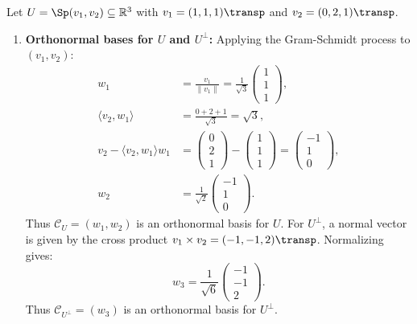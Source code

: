 \begin{exercisesolution*}
\label{sol:orthogonal_projection_computation}
Let $U = \Sp(v_1, v_2) \subseteq \mathbb{R}^3$ with $v_1 = (1, 1, 1)\transp$ and $v_2 = (0, 2, 1)\transp$.
\begin{enumerate}[label=\textbf{(\alph*)}]
    \item \textbf{Orthonormal bases for $U$ and $U^\perp$:}
    Applying the Gram-Schmidt process to $(v_1, v_2)$:
    \begin{align*}
    w_1 &= \frac{v_1}{\|v_1\|} = \frac{1}{\sqrt{3}}\begin{pmatrix} 1 \\ 1 \\ 1 \end{pmatrix}, \\
    \langle v_2, w_1 \rangle &= \frac{0 + 2 + 1}{\sqrt{3}} = \sqrt{3}, \\
    v_2 - \langle v_2, w_1 \rangle w_1 &= \begin{pmatrix} 0 \\ 2 \\ 1 \end{pmatrix} - \begin{pmatrix} 1 \\ 1 \\ 1 \end{pmatrix} = \begin{pmatrix} -1 \\ 1 \\ 0 \end{pmatrix}, \\
    w_2 &= \frac{1}{\sqrt{2}}\begin{pmatrix} -1 \\ 1 \\ 0 \end{pmatrix}.
    \end{align*}
    Thus $\mathcal{C}_U = (w_1, w_2)$ is an orthonormal basis for $U$.
    For $U^\perp$, a normal vector is given by the cross product $v_1 \times v_2 = (-1, -1, 2)\transp$. Normalizing gives:
    \[
    w_3 = \frac{1}{\sqrt{6}}\begin{pmatrix} -1 \\ -1 \\ 2 \end{pmatrix}.
    \]
    Thus $\mathcal{C}_{U^\perp} = (w_3)$ is an orthonormal basis for $U^\perp$.


\end{enumerate}
\end{exercisesolution*}

